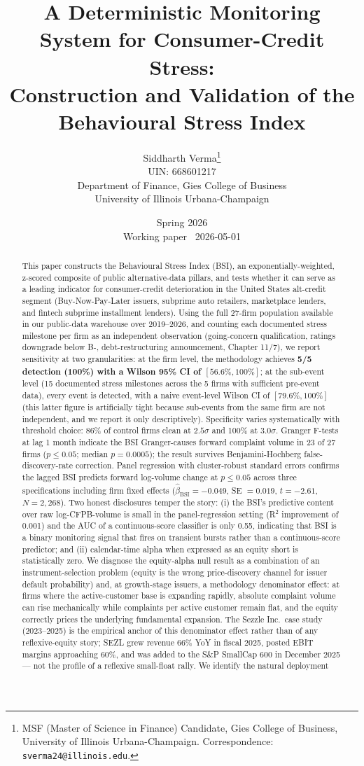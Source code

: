 \documentclass[11pt,a4paper]{article}
\title{
  \vspace{-1.5cm}
  \LARGE\textbf{A Deterministic Monitoring System for Consumer-Credit Stress:} \\
  \vspace{0.15cm}
  \large\textbf{Construction and Validation of the Behavioural Stress Index}
}
\author{
  Siddharth Verma\thanks{MSF (Master of Science in Finance) Candidate, Gies College of Business, University of Illinois Urbana-Champaign. Correspondence: \texttt{sverma24@illinois.edu}.} \\
  \small UIN: 668601217 \\
  \small Department of Finance, Gies College of Business \\
  \small University of Illinois Urbana-Champaign
}
\date{
  Spring 2026 \\
  \small Working paper \textbar\ 2026-05-01
}
\begin{document}
\maketitle
\thispagestyle{empty}

\begin{abstract}
\noindent
This paper constructs the Behavioural Stress Index (BSI), an exponentially-weighted, z-scored composite of public alternative-data pillars, and tests whether it can serve as a leading indicator for consumer-credit deterioration in the United States alt-credit segment (Buy-Now-Pay-Later issuers, subprime auto retailers, marketplace lenders, and fintech subprime installment lenders). Using the full 27-firm population available in our public-data warehouse over 2019--2026, and counting each documented stress milestone per firm as an independent observation (going-concern qualification, ratings downgrade below B-, debt-restructuring announcement, Chapter 11/7), we report sensitivity at two granularities: at the firm level, the methodology achieves \textbf{5/5 detection (100\%) with a Wilson 95\% CI of $[56.6\%, 100\%]$}; at the sub-event level (15 documented stress milestones across the 5 firms with sufficient pre-event data), every event is detected, with a naive event-level Wilson CI of $[79.6\%, 100\%]$ (this latter figure is artificially tight because sub-events from the same firm are not independent, and we report it only descriptively). Specificity varies systematically with threshold choice: 86\% of control firms clean at $2.5\sigma$ and 100\% at $3.0\sigma$. Granger F-tests at lag 1 month indicate the BSI Granger-causes forward complaint volume in 23 of 27 firms ($p \le 0.05$; median $p = 0.0005$); the result survives Benjamini-Hochberg false-discovery-rate correction. Panel regression with cluster-robust standard errors confirms the lagged BSI predicts forward log-volume change at $p \le 0.05$ across three specifications including firm fixed effects ($\hat{\beta}_{\text{BSI}} = -0.049$, SE $= 0.019$, $t = -2.61$, $N = 2{,}268$). Two honest disclosures temper the story: (i) the BSI's predictive content over raw log-CFPB-volume is small in the panel-regression setting (R$^2$ improvement of 0.001) and the AUC of a continuous-score classifier is only 0.55, indicating that BSI is a binary monitoring signal that fires on transient bursts rather than a continuous-score predictor; and (ii) calendar-time alpha when expressed as an equity short is statistically zero. We diagnose the equity-alpha null result as a combination of an instrument-selection problem (equity is the wrong price-discovery channel for issuer default probability) and, at growth-stage issuers, a methodology denominator effect: at firms where the active-customer base is expanding rapidly, absolute complaint volume can rise mechanically while complaints per active customer remain flat, and the equity correctly prices the underlying fundamental expansion. The Sezzle Inc.\ case study (2023--2025) is the empirical anchor of this denominator effect rather than of any reflexive-equity story; SEZL grew revenue 66\% YoY in fiscal 2025, posted EBIT margins approaching 60\%, and was added to the S\&P SmallCap 600 in December 2025 --- not the profile of a reflexive small-float rally. We identify the natural deployment 
\end{abstract}
\end{document}
